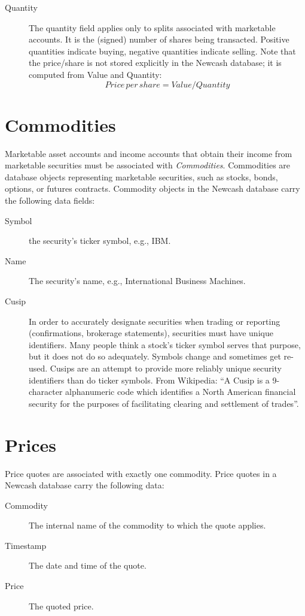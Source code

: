 \documentclass{report}
\begin{document}
\begin{description}
\item [Quantity] The quantity field applies only to splits associated with marketable accounts. It is the (signed) number of shares being transacted. Positive quantities indicate buying, negative quantities indicate selling.  Note that the price/share is not stored explicitly in the Newcash database; it is computed from Value and Quantity:
\begin{equation}
Price\,per\,share = Value / Quantity 
\end{equation}
\end{description}

\section{Commodities}
Marketable asset accounts and income accounts that obtain their income from marketable securities must be associated with \emph{Commodities}. Commodities are database objects representing marketable securities, such as stocks, bonds, options, or futures contracts. Commodity objects in the Newcash database carry the following data fields:
\begin{description}
\item [Symbol] the security's ticker symbol, e.g., IBM. 
\item [Name] The security's name, e.g., International Business Machines.
\item [Cusip] In order to accurately designate securities when trading or reporting (confirmations, brokerage statements), securities must have unique identifiers. Many people think a stock's ticker symbol serves that purpose, but it does not do so adequately. Symbols change and sometimes get re-used. Cusips are an attempt to provide more reliably unique security identifiers than do ticker symbols. From Wikipedia: ``A Cusip is a 9-character alphanumeric code which identifies a North American financial security for the purposes of facilitating clearing and settlement of trades''.
\end{description}

\section{Prices}
Price quotes are associated with exactly one commodity.  Price quotes in a Newcash database carry the following data:
\begin{description}
\item [Commodity] The internal name of the commodity to which the quote applies.
\item [Timestamp] The date and time of the quote.
\item [Price] The quoted price.
\end{description}
\end{document}
